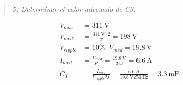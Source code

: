 \begin{quote} \textit{5) Determinar el valor adecuado de C3.}
\end{quote}


\begin{align}
	V_{max}  &=\SI{311}{\volt} \\
	V_{med}  & = \frac{\SI{311}{\volt}\cdot 2}{\pi} = \SI{198}{\volt} \\
	V_{ripple} &= 10\% \cdot V_{med} = \SI{19.8}{\volt}\\
	I_{med} &= \frac{V_{med}}{R_L} = \frac{\SI{19.8}{\volt}}{\SI{3}{\ohm}} = \SI{6.6}{\ampere} \\
	C_3 &= \frac{I_{med}}{V_{ripple}2f} = \frac{\SI{6.6}{\ampere}}{\SI{19.8}{\volt}2 \SI{50}{\hertz}} = \boxed{\SI{3.3}{\milli\farad}} \\
\end{align}

